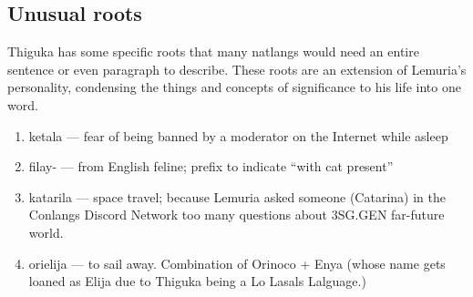 \newpage{}
\subsection{Unusual roots}
Thiguka has some specific roots that many natlangs would need an entire sentence or even paragraph to describe.
These roots are an extension of Lemuria's personality, condensing the things and concepts of significance to his life into one word.

\begin{multicols}{2} 
\begin{enumerate}
    \item ketala --- fear of being banned by a moderator on the Internet while asleep
    \item filay- --- from English feline; prefix to indicate ``with cat present''
    \item katarila --- space travel; because Lemuria asked someone (Catarina) in the Conlangs Discord Network too many questions about 3SG.GEN far-future world.
    \item orielija --- to sail away. Combination of Orinoco + Enya (whose name gets loaned as Elija due to Thiguka being a Lo Lasals Lalguage.)
\end{enumerate}
\end{multicols}
